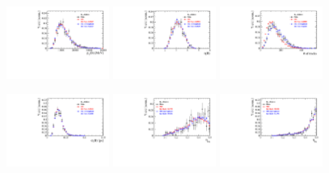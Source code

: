 \begin{figure}[h]
\centering
\includegraphics[height=!,width=0.3\textwidth]{figs/dataVsMC/signal_final/combined/Ds2KKpi_1_Bs_PT.pdf}
\includegraphics[height=!,width=0.3\textwidth]{figs/dataVsMC/signal_final/combined/Ds2KKpi_1_Bs_ETA.pdf}
\includegraphics[height=!,width=0.3\textwidth]{figs/dataVsMC/signal_final/combined/Ds2KKpi_1_NTracks.pdf}

\includegraphics[height=!,width=0.3\textwidth]{figs/dataVsMC/signal_final/combined/Ds2KKpi_1_Bs_DTF_TAUERR.pdf}
\includegraphics[height=!,width=0.3\textwidth]{figs/dataVsMC/signal_final/combined/Ds2KKpi_1_Bs_TAGOMEGA_OS.pdf}
\includegraphics[height=!,width=0.3\textwidth]{figs/dataVsMC/signal_final/combined/Ds2KKpi_1_Bs_SS_nnetKaon_PROB.pdf}


\end{figure}
